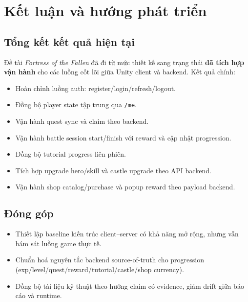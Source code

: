\section{Kết luận và hướng phát triển}
\label{sec:conclusion}

\subsection{Tổng kết kết quả hiện tại}
\label{subsec:conclusion-summary}

Đề tài \textit{Fortress of the Fallen} đã đi từ mức thiết kế sang trạng thái \textbf{đã tích hợp vận hành} cho các luồng cốt lõi giữa Unity client và backend. Kết quả chính:
\begin{itemize}
    \item Hoàn chỉnh luồng auth: register/\allowbreak login/\allowbreak refresh/\allowbreak logout.
    \item Đồng bộ player state tập trung qua \texttt{/me}.
    \item Vận hành quest sync và claim theo backend.
    \item Vận hành battle session start/\allowbreak finish với reward và cập nhật progression.
    \item Đồng bộ tutorial progress liên phiên.
    \item Tích hợp upgrade hero/\allowbreak skill và castle upgrade theo API backend.
    \item Vận hành shop catalog/\allowbreak purchase và popup reward theo payload backend.
\end{itemize}

\subsection{Đóng góp}
\label{subsec:conclusion-contributions}

\begin{itemize}
    \item Thiết lập baseline kiến trúc client--server có khả năng mở rộng, nhưng vẫn bám sát luồng game thực tế.
    \item Chuẩn hoá nguyên tắc backend source-of-truth cho progression (exp/\allowbreak level/\allowbreak quest/\allowbreak reward/\allowbreak tutorial/\allowbreak castle/\allowbreak shop currency).
    \item Đồng bộ tài liệu kỹ thuật theo hướng claim có evidence, giảm drift giữa báo cáo và runtime.
\end{itemize}

